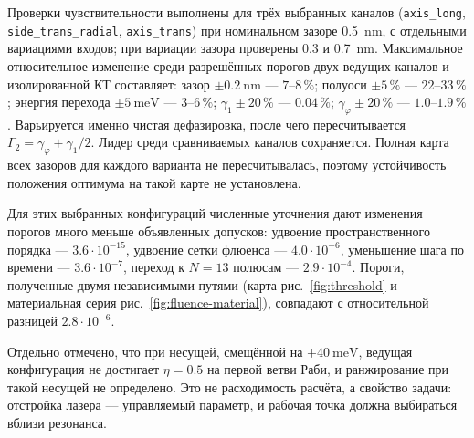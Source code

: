 Проверки чувствительности выполнены для трёх выбранных каналов
(\texttt{axis\_long}, \texttt{side\_trans\_radial}, \texttt{axis\_trans})
при номинальном зазоре \SI{0.5}{\nano\meter}, с отдельными вариациями
входов; при вариации зазора проверены $0.3$ и \SI{0.7}{\nano\meter}.
Максимальное относительное изменение среди разрешённых порогов двух
ведущих каналов и изолированной КТ составляет: зазор $\pm\SI{0.2}{\nano\meter}$
— $7$--$8\,\%$; полуоси $\pm5\,\%$ — $22$--$33\,\%$; энергия перехода
$\pm\SI{5}{\milli\electronvolt}$ — $3$--$6\,\%$; $\gamma_1\pm20\,\%$ —
$0.04\,\%$; $\gamma_\varphi\pm20\,\%$ --- $1.0$--$1.9\,\%$.
Варьируется именно чистая дефазировка, после чего пересчитывается
$\Gamma_2=\gamma_\varphi+\gamma_1/2$. Лидер среди сравниваемых каналов
сохраняется. Полная карта всех зазоров для каждого варианта не пересчитывалась,
поэтому устойчивость положения оптимума на такой карте не установлена.

Для этих выбранных конфигураций численные уточнения дают изменения
порогов много меньше объявленных допусков:
удвоение пространственного порядка — $3.6\cdot10^{-15}$, удвоение сетки
флюенса — $4.0\cdot10^{-6}$, уменьшение шага по времени — $3.6\cdot10^{-7}$,
переход к $N=13$ полюсам — $2.9\cdot10^{-4}$. Пороги, полученные двумя
независимыми путями (карта рис.~\ref{fig:threshold} и материальная серия рис.~\ref{fig:fluence-material}), совпадают с
относительной разницей $2.8\cdot10^{-6}$.

Отдельно отмечено, что при несущей, смещённой на $+\SI{40}{\milli\electronvolt}$,
ведущая конфигурация не достигает $\eta=0.5$ на первой ветви Раби, и
ранжирование при такой несущей не определено. Это не расходимость расчёта, а
свойство задачи: отстройка лазера — управляемый параметр, и рабочая точка должна
выбираться вблизи резонанса.
